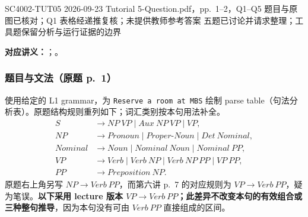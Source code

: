 
\label{tutorial:SC4002-TUT05}

\tutorialmeta
  {SC4002-TUT05}
  {2026-09-23}
  {Tutorial 5-Question.pdf，pp.~1--2，Q1--Q5}
  {题目与原图已核对；Q1 表格经递推复核；未提供教师参考答案}
  {五题已讨论并请求整理；工具题保留分析与运行证据的边界}


\textbf{对应讲义：}；。

\subsubsection*{题目与文法（原题 p.~1）}

使用给定的 L1 grammar，为 \texttt{Reserve a room at MBS} 绘制 parse table（句法分析表）。原题结构规则重列如下；词汇类别按本句用法补全。
\[
\begin{aligned}
S&\rightarrow NP\ VP\mid Aux\ NP\ VP\mid VP,\\
NP&\rightarrow Pronoun\mid Proper\text{-}Noun\mid Det\ Nominal,\\
Nominal&\rightarrow Noun\mid Nominal\ Noun\mid Nominal\ PP,\\
VP&\rightarrow Verb\mid Verb\ NP\mid Verb\ NP\ PP\mid VP\ PP,\\
PP&\rightarrow Preposition\ NP.
\end{aligned}
\]
原题右上角另写 $NP\rightarrow Verb\ PP$，而第六讲 p.~7 的对应规则为 $VP\rightarrow Verb\ PP$，疑为笔误。\textbf{以下采用 lecture 版本 $VP\rightarrow Verb\ PP$；此差异不改变本句的有效组合或三种整句推导}，因为本句没有可由 $Verb\ PP$ 直接组成的区间。

